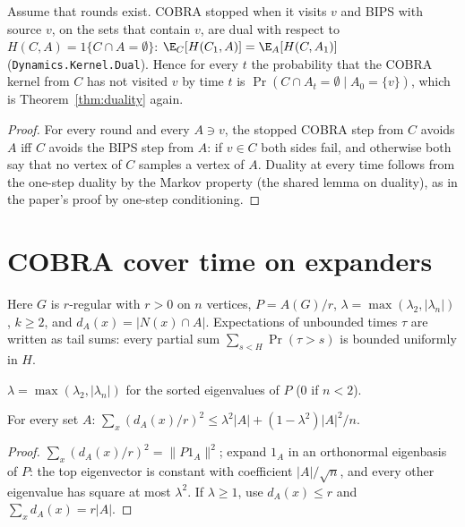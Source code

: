 \begin{theorem}\label{thm:duality-kernels}
\leanok{}
Assume that rounds exist. COBRA stopped when it visits $v$ and BIPS with source $v$, on the sets
that contain $v$, are dual with respect to $H(C,A)=1\{C\cap A=\emptyset\}$:
$\E_C[H(C_1,A)]=\E_A[H(C,A_1)]$ (\texttt{Dynamics.Kernel.Dual}). Hence for every $t$ the
probability that the COBRA kernel from $C$ has not visited $v$ by time $t$ is
$\Pr(C\cap A_t=\emptyset\mid A_0=\{v\})$, which is Theorem~\ref{thm:duality} again.
\end{theorem}
\begin{proof}\leanok
For every round and every $A\ni v$, the stopped COBRA step from $C$ avoids $A$ iff $C$ avoids the
BIPS step from $A$: if $v\in C$ both sides fail, and otherwise both say that no vertex of $C$
samples a vertex of $A$. Duality at every time follows from the one-step duality by the Markov
property (the shared lemma on duality), as in the paper's proof by one-step conditioning.
\end{proof}

\section{COBRA cover time on expanders}\label{sec:crr-cover}
Here $G$ is $r$-regular with $r>0$ on $n$ vertices, $P=A(G)/r$, $\lambda=\max(\lambda_2,|\lambda_n|)$,
$k\ge2$, and $d_A(x)=|N(x)\cap A|$. Expectations of unbounded times $\tau$ are written as tail
sums: every partial sum $\sum_{s<H}\Pr(\tau>s)$ is bounded uniformly in $H$.

\begin{definition}\label{def:lambda}
\leanok
$\lambda=\max(\lambda_2,|\lambda_n|)$ for the sorted eigenvalues of $P$ ($0$ if $n<2$).
\end{definition}

\begin{lemma}\label{lem:crr-spectral}
\leanok{}
For every set $A$: $\sum_x (d_A(x)/r)^2\le\lambda^2|A|+(1-\lambda^2)|A|^2/n$.
\end{lemma}
\begin{proof}\leanok
$\sum_x(d_A(x)/r)^2=\|P1_A\|^2$; expand $1_A$ in an orthonormal eigenbasis of $P$: the top
eigenvector is constant with coefficient $|A|/\sqrt n$, and every other eigenvalue has square
at most $\lambda^2$. If $\lambda\ge1$, use $d_A(x)\le r$ and $\sum_x d_A(x)=r|A|$.
\end{proof}

